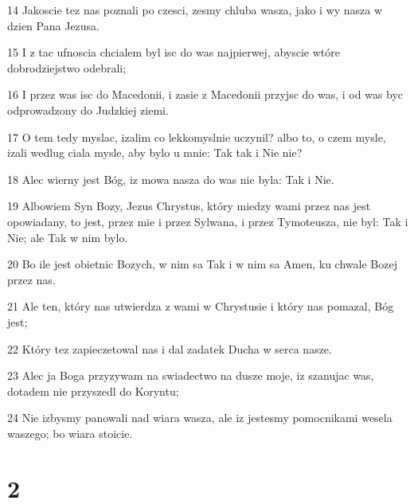 \par 14 Jakoscie tez nas poznali po czesci, zesmy chluba wasza, jako i wy nasza w dzien Pana Jezusa.
\par 15 I z tac ufnoscia chcialem byl isc do was najpierwej, abyscie wtóre dobrodziejstwo odebrali;
\par 16 I przez was isc do Macedonii, i zasie z Macedonii przyjsc do was, i od was byc odprowadzony do Judzkiej ziemi.
\par 17 O tem tedy myslac, izalim co lekkomyslnie uczynil? albo to, o czem mysle, izali wedlug ciala mysle, aby bylo u mnie: Tak tak i Nie nie?
\par 18 Alec wierny jest Bóg, iz mowa nasza do was nie byla: Tak i Nie.
\par 19 Albowiem Syn Bozy, Jezus Chrystus, który miedzy wami przez nas jest opowiadany, to jest, przez mie i przez Sylwana, i przez Tymoteusza, nie byl: Tak i Nie; ale Tak w nim bylo.
\par 20 Bo ile jest obietnic Bozych, w nim sa Tak i w nim sa Amen, ku chwale Bozej przez nas.
\par 21 Ale ten, który nas utwierdza z wami w Chrystusie i który nas pomazal, Bóg jest;
\par 22 Który tez zapieczetowal nas i dal zadatek Ducha w serca nasze.
\par 23 Alec ja Boga przyzywam na swiadectwo na dusze moje, iz szanujac was, dotadem nie przyszedl do Koryntu;
\par 24 Nie izbysmy panowali nad wiara wasza, ale iz jestesmy pomocnikami wesela waszego; bo wiara stoicie.

\chapter{2}

